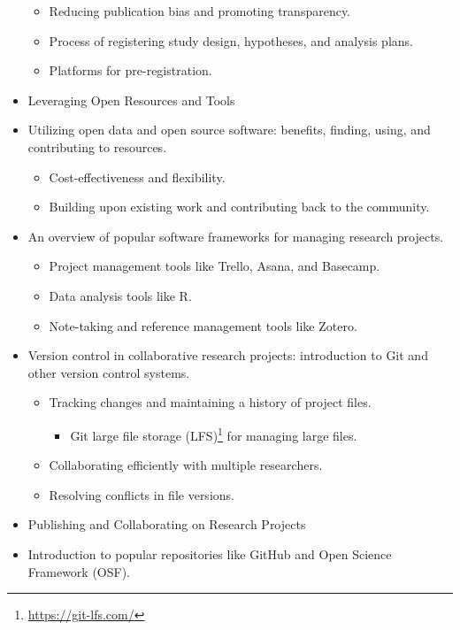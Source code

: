 \documentclass[
  letterpaper,
  DIV=11,
  numbers=noendperiod]{scrreprt}
\providecommand{\tightlist}{%
  \setlength{\itemsep}{0pt}\setlength{\parskip}{0pt}}\usepackage{longtable,booktabs,array}
\theoremstyle{definition}
\theoremstyle{remark}
\DeclareRobustCommand{\href}[2]{#2\footnote{\url{#1}}}
\begin{document}
\begin{itemize}
  \begin{itemize}
  \tightlist
  \item
    Reducing publication bias and promoting transparency.
  \item
    Process of registering study design, hypotheses, and analysis plans.
  \item
    Platforms for pre-registration.
  \end{itemize}
\item
  Leveraging Open Resources and Tools
\item
  Utilizing open data and open source software: benefits, finding,
  using, and contributing to resources.

  \begin{itemize}
  \tightlist
  \item
    Cost-effectiveness and flexibility.
  \item
    Building upon existing work and contributing back to the community.
  \end{itemize}
\item
  An overview of popular software frameworks for managing research
  projects.

  \begin{itemize}
  \tightlist
  \item
    Project management tools like Trello, Asana, and Basecamp.
  \item
    Data analysis tools like R.
  \item
    Note-taking and reference management tools like Zotero.
  \end{itemize}
\item
  Version control in collaborative research projects: introduction to
  Git and other version control systems.

  \begin{itemize}
  \tightlist
  \item
    Tracking changes and maintaining a history of project files.

    \begin{itemize}
    \tightlist
    \item
      \href{https://git-lfs.com/}{Git large file storage (LFS)} for
      managing large files.
    \end{itemize}
  \item
    Collaborating efficiently with multiple researchers.
  \item
    Resolving conflicts in file versions.
  \end{itemize}
\item
  Publishing and Collaborating on Research Projects
\item
  Introduction to popular repositories like GitHub and Open Science
  Framework (OSF).


\end{itemize}
\end{document}
